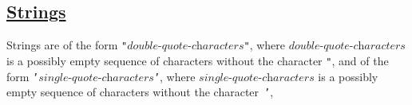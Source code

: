\subsection*{\href{https://source-academy.github.io/sicp/chapters/2.3.1.html}{Strings}}

Strings are of the form \texttt{"}$ \textit{double-quote-characters} $\texttt{"},
where $\textit{double-quote-characters}$ is a possibly empty sequence of characters without
the character \texttt{"}, 
and of the form
\texttt{'}$ \textit{single-quote-characters} $\texttt{'},
where $\textit{single-quote-characters}$ is a possibly empty sequence of characters without
the character~\texttt{'}, 
